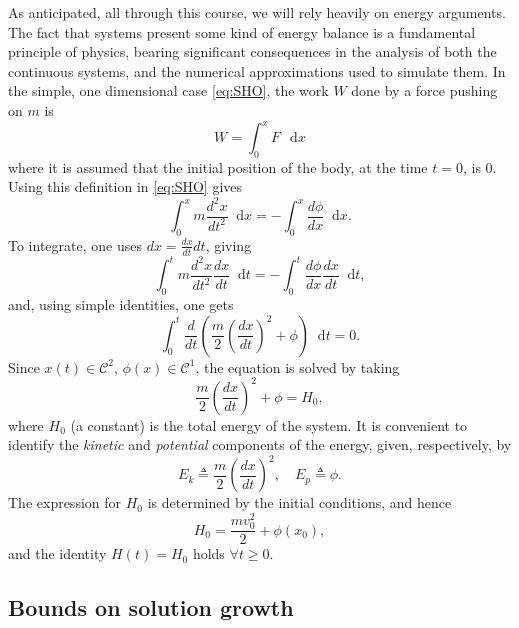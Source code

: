 \documentclass[11pt,twoside,a4paper,english]{book}
\newcommand{\dif}{\mathop{}\!\mathrm{d}}
\begin{document}
As anticipated, all through this course, we will rely heavily on energy arguments. The fact that systems present some kind of energy balance is a fundamental principle of physics, bearing significant  consequences in the analysis of both the continuous systems, and the numerical approximations used to simulate them. In the simple, one dimensional case \eqref{eq:SHO}, the work $W$ done by a force pushing on $m$ is
\begin{equation}
    W = \int_0^x F \, \dif x
\end{equation}
where it is assumed that the initial position of the body, at the time $t=0$, is 0. Using this definition in \eqref{eq:SHO} gives
\begin{equation}
    \int_0^x m \frac{d^2 x}{dt^2} \dif x = - \int_0^x \frac{d\phi}{dx} \dif x.
\end{equation}
To integrate, one uses $dx = \frac{dx}{dt} dt$, giving
\begin{equation}\label{eq:EnAnGen}
    \int_0^t m \frac{d^2 x}{dt^2} \frac{d x}{dt} \dif t = - \int_0^t \frac{d\phi}{dx} \frac{dx}{dt} \dif t,
\end{equation}
and, using simple identities, one gets
\begin{equation}\label{eq:En1}
    \int_0^t \frac{d}{dt}\left( \frac{m}{2}\left(\frac{dx}{dt}\right)^2 + \phi  \right) \dif t = 0.
\end{equation}
Since $x(t) \in \mathcal{C}^2$, $\phi(x) \in \mathcal{C}^1$, the equation is solved by taking
\begin{equation}\label{eq:En2}
    \frac{m}{2}\left(\frac{dx}{dt}\right)^2 + \phi = H_0,
\end{equation}
where $H_0$ (a constant) is the total energy of the system. It is convenient to identify the \emph{kinetic} and \emph{potential} components of the energy, given, respectively, by
\begin{equation}
    E_k \triangleq \frac{m}{2}\left(\frac{dx}{dt}\right)^2, \quad E_p \triangleq \phi.
\end{equation}
The expression for $H_0$ is determined by the initial conditions, and hence
\begin{equation}\label{eq:EnCons}
    H_0 = \frac{m v_0^2}{2} + \phi(x_0),
\end{equation}
and the identity $H(t) = H_0$ holds $\forall t \geq 0$. 

\subsection{Bounds on solution growth}\label{sec:BoundsSHO}
\end{document}

